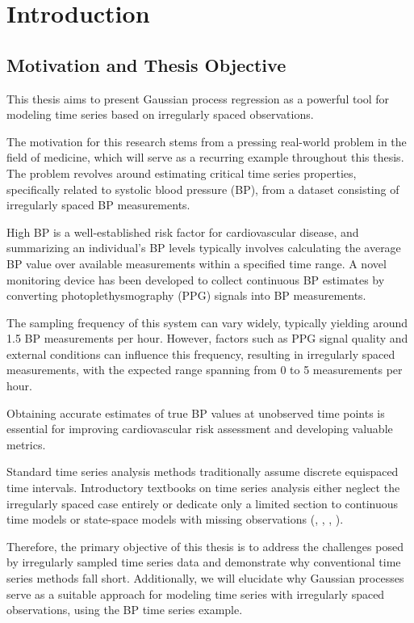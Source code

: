 \chapter{Introduction}\label{ch:introduction}

\section{Motivation and Thesis Objective}\label{sec:thesis-objective}

This thesis aims to present Gaussian process regression as a powerful tool for
modeling time series based on irregularly spaced observations.

The motivation for this research stems from a pressing real-world problem in the
field of medicine, which will serve as a recurring example throughout this
thesis. The problem revolves around estimating critical time series properties,
specifically related to systolic blood pressure (BP), from a dataset consisting
of irregularly spaced BP measurements.

High BP is a well-established risk factor for cardiovascular disease, and
summarizing an individual's BP levels typically involves calculating the average
BP value over available measurements within a specified time range. A novel
monitoring device has been developed to collect continuous BP estimates by
converting photoplethysmography (PPG) signals into BP measurements.

The sampling frequency of this system can vary widely, typically yielding around
1.5 BP measurements per hour. However, factors such as PPG signal quality and
external conditions can influence this frequency, resulting in irregularly spaced
measurements, with the expected range spanning from 0 to 5 measurements per hour.

Obtaining accurate estimates of true BP values at unobserved time points is
essential for improving cardiovascular risk assessment and developing valuable
metrics.

Standard time series analysis methods traditionally assume discrete equispaced
time intervals. Introductory textbooks on time series analysis either neglect
the irregularly spaced case entirely or dedicate only a limited section to
continuous time models or state-space models with missing observations (\citeauthor{brockwell_time_1991}, \citeauthor{brockwell_introduction_2016},
\citeauthor{cryer_time_2008}, \citeauthor{chatfield_analysis_2003}).

Therefore, the primary objective of this thesis is to address the challenges
posed by irregularly sampled time series data and demonstrate why conventional
time series methods fall short. Additionally, we will elucidate why Gaussian
processes serve as a suitable approach for modeling time series with irregularly
spaced observations, using the BP time series example.

